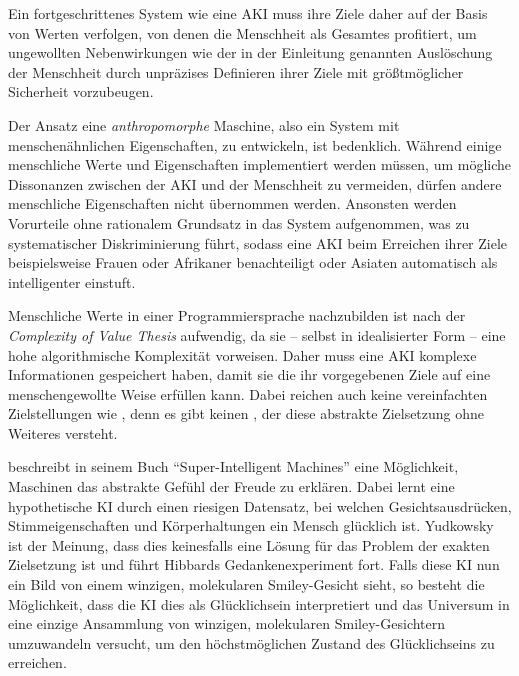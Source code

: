 Ein fortgeschrittenes System wie eine AKI muss ihre Ziele daher auf der Basis von Werten verfolgen, von denen die Menschheit als Gesamtes profitiert, um ungewollten Nebenwirkungen wie der in der Einleitung genannten Auslöschung der Menschheit durch unpräzises Definieren ihrer Ziele mit größtmöglicher Sicherheit vorzubeugen.

Der Ansatz eine \emph{anthropomorphe} Maschine, also ein System mit menschenähnlichen Eigenschaften, zu entwickeln, ist bedenklich. Während einige menschliche Werte und Eigenschaften implementiert werden müssen, um mögliche Dissonanzen zwischen der AKI und der Menschheit zu vermeiden, dürfen andere menschliche Eigenschaften nicht übernommen werden. Ansonsten werden Vorurteile ohne rationalem Grundsatz in das System aufgenommen, was zu systematischer Diskriminierung führt, sodass eine AKI beim Erreichen ihrer Ziele beispielsweise Frauen oder Afrikaner benachteiligt oder Asiaten automatisch als intelligenter einstuft.

Menschliche Werte in einer Programmiersprache nachzubilden ist nach der \emph{Complexity of Value Thesis} aufwendig, da sie -- selbst in idealisierter Form -- eine hohe algorithmische Komplexität vorweisen. Daher muss eine AKI komplexe Informationen gespeichert haben, damit sie die ihr vorgegebenen Ziele auf eine menschengewollte Weise erfüllen kann. Dabei reichen auch keine vereinfachten Zielstellungen wie  , denn es gibt keinen , der diese abstrakte Zielsetzung ohne Weiteres versteht.

\citeauthor{hibbard_super-intelligent_2002} beschreibt in seinem Buch \enquote{Super-Intelligent Machines} eine Möglichkeit, Maschinen das abstrakte Gefühl der Freude zu erklären. Dabei lernt eine hypothetische KI durch einen riesigen Datensatz, bei welchen Gesichtsausdrücken, Stimmeigenschaften und Körperhaltungen ein Mensch glücklich ist. Yudkowsky ist der Meinung, dass dies keinesfalls eine Lösung für das Problem der exakten Zielsetzung ist und führt Hibbards Gedankenexperiment fort. Falls diese KI nun ein Bild von einem winzigen, molekularen Smiley-Gesicht sieht, so besteht die Möglichkeit, dass die KI dies als Glücklichsein interpretiert und das Universum in eine einzige Ansammlung von winzigen, molekularen Smiley-Gesichtern umzuwandeln versucht, um den höchstmöglichen Zustand des Glücklichseins zu erreichen. 

